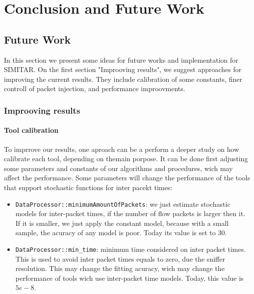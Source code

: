 \chapter{Conclusion and Future Work}
\label{ch:conclusion}

\section{Future Work}

In this section we present some ideas for future works and implementation for SIMITAR. On the first section "Improoving results", we suggest approaches for improving the current results. They include calibration of some constants, finer controll of packet injection, and performance improovments. 

\subsection{Improoving results}

\subsubsection{Tool calibration}

To imprrove our results, one aproach can be a perform  a deeper study on how calibrate each tool, depending on themain porpose. It can be done first adjusting some parameters and constants of our algorithms and procedures, wich may affect the performance. Some parameters will change the performance  of the tools that support stochastic functions for inter pacekt times:

\begin{itemize}
	
	\item \texttt{DataProcessor::minimumAmountOfPackets}: we just estimate stochastic models for inter-packet times, if the number of flow packets is larger then it. If it is smaller, we just apply the constant model, because with a small sample, the acuracy of any model is poor. Today its value is set to 30.
	
	\item \texttt{DataProcessor::min\_time}: minimum time considered on inter packet times. This is used to avoid inter packet times equals to zero, due the sniffer resolution. This may change the fitting acuracy, wich may change the performance of tools wich use inter-packet time models. Today, this value is $5e-8$. 

\end{itemize}

